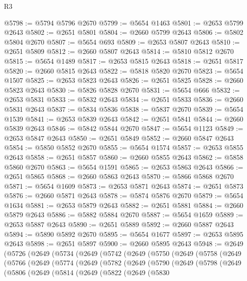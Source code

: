\begin{lexlean}{R3}
\begin{coremodule}
@5798 := @5794 @5796 @2670
@5799 := @5654 @1463
@5801 := @2653 @5799 @2643
@5802 := @2651 @5801
@5804 := @2660 @5799 @2643
@5806 := @5802 @5804 @2670
@5807 := @5654 @693
@5809 := @2653 @5807 @2643
@5810 := @2651 @5809
@5812 := @2660 @5807 @2643
@5814 := @5810 @5812 @2670
@5815 := @5654 @1489
@5817 := @2653 @5815 @2643
@5818 := @2651 @5817
@5820 := @2660 @5815 @2643
@5822 := @5818 @5820 @2670
@5823 := @5654 @1507
@5825 := @2653 @5823 @2643
@5826 := @2651 @5825
@5828 := @2660 @5823 @2643
@5830 := @5826 @5828 @2670
@5831 := @5654 @666
@5832 := @2653 @5831
@5833 := @5832 @2643
@5834 := @2651 @5833
@5836 := @2660 @5831 @2643
@5837 := @5834 @5836
@5838 := @5837 @2670
@5839 := @5654 @1539
@5841 := @2653 @5839 @2643
@5842 := @2651 @5841
@5844 := @2660 @5839 @2643
@5846 := @5842 @5844 @2670
@5847 := @5654 @1123
@5849 := @2653 @5847 @2643
@5850 := @2651 @5849
@5852 := @2660 @5847 @2643
@5854 := @5850 @5852 @2670
@5855 := @5654 @1574
@5857 := @2653 @5855 @2643
@5858 := @2651 @5857
@5860 := @2660 @5855 @2643
@5862 := @5858 @5860 @2670
@5863 := @5654 @1591
@5865 := @2653 @5863 @2643
@5866 := @2651 @5865
@5868 := @2660 @5863 @2643
@5870 := @5866 @5868 @2670
@5871 := @5654 @1609
@5873 := @2653 @5871 @2643
@5874 := @2651 @5873
@5876 := @2660 @5871 @2643
@5878 := @5874 @5876 @2670
@5879 := @5654 @1634
@5881 := @2653 @5879 @2643
@5882 := @2651 @5881
@5884 := @2660 @5879 @2643
@5886 := @5882 @5884 @2670
@5887 := @5654 @1659
@5889 := @2653 @5887 @2643
@5890 := @2651 @5889
@5892 := @2660 @5887 @2643
@5894 := @5890 @5892 @2670
@5895 := @5654 @1677
@5897 := @2653 @5895 @2643
@5898 := @2651 @5897
@5900 := @2660 @5895 @2643
@5948 := @2649
    (@5726
      (@2649
        (@5734
          (@2649
            (@5742
              (@2649
                (@5750
                  (@2649
                    (@5758
                      (@2649
                        (@5766
                          (@2649
                            (@5774
                              (@2649
                                (@5782
                                  (@2649
                                    (@5790
                                      (@2649
                                        (@5798
                                          (@2649
                                            (@5806
                                              (@2649
                                                (@5814
                                                  (@2649
                                                    (@5822
                                                      (@2649
                                                        (@5830

\end{coremodule}
\end{lexlean}
